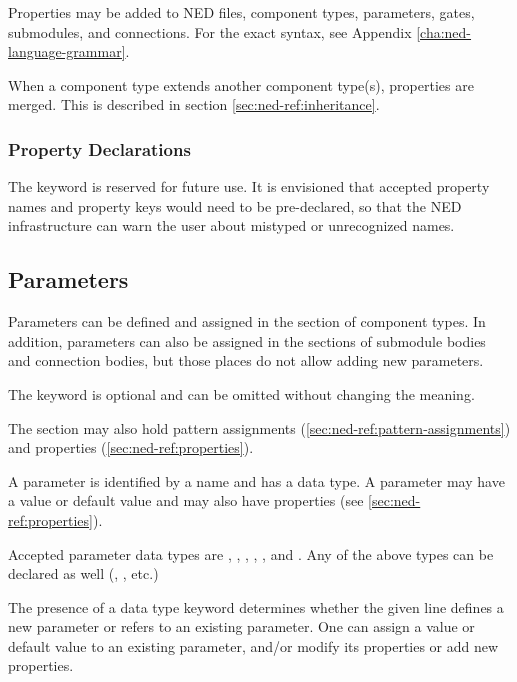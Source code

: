 Properties may be added to NED files, component types, parameters,
gates, submodules, and connections. For the exact syntax, see
Appendix \ref{cha:ned-language-grammar}.

When a component type extends another component type(s), properties
are merged. This is described in section \ref{sec:ned-ref:inheritance}.


\subsubsection{Property Declarations}
\label{sec:ned-ref:property-declarations}

The  keyword is reserved for future use. It is
envisioned that accepted property names and property keys would need
to be pre-declared, so that the NED infrastructure can warn the user
about mistyped or unrecognized names.


\subsection{Parameters}
\label{sec:ned-ref:parameters}

Parameters can be defined and assigned in the  section
of component types. In addition, parameters can also be assigned in the
 sections of submodule bodies and connection bodies,
but those places do not allow adding new parameters.

The  keyword is optional and can be omitted
without changing the meaning.

The  section may also hold pattern assignments
(\ref{sec:ned-ref:pattern-assignments}) and properties
(\ref{sec:ned-ref:properties}).

A parameter is identified by a name and has a data type. A parameter
may have a value or default value and may also have properties
(see \ref{sec:ned-ref:properties}).

Accepted parameter data types are , ,
, , , and .
Any of the above types can be declared  as well
(, , etc.)

The presence of a data type keyword determines whether the given line defines
a new parameter or refers to an existing parameter. One can assign a value or
default value to an existing parameter, and/or modify its properties or add
new properties.

